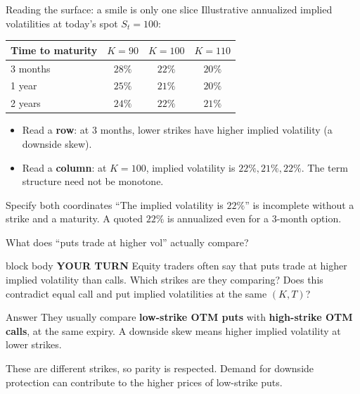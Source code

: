 \documentclass[handout,10pt,aspectratio=169]{beamer}
\newenvironment{pausebox}{\begin{beamercolorbox}[rounded=true,sep=0.8em,wd=\textwidth]{block body}
  \textbf{\color{CourseGold}YOUR TURN}\quad}{\end{beamercolorbox}}
\newcommand{\1}{\mathbf 1}
\begin{document}
\begin{frame}{Reading the surface: a smile is only one slice}
Illustrative annualized implied volatilities at today's spot \(S_t=100\):
\begin{center}
\begin{tabular}{lccc}
\toprule
Time to maturity & \(K=90\) & \(K=100\) & \(K=110\)\\
\midrule
3 months & \(28\%\) & \(22\%\) & \(20\%\)\\
1 year   & \(25\%\) & \(21\%\) & \(20\%\)\\
2 years  & \(24\%\) & \(22\%\) & \(21\%\)\\
\bottomrule
\end{tabular}
\end{center}
\begin{itemize}
\item Read a \textbf{row}: at 3 months, lower strikes have higher implied
      volatility (a downside skew).
\item Read a \textbf{column}: at \(K=100\), implied volatility is
      \(22\%,21\%,22\%\). The term structure need not be monotone.
\end{itemize}
\begin{block}{Specify both coordinates}
``The implied volatility is \(22\%\)'' is incomplete without a strike and
a maturity. A quoted \(22\%\) is annualized even for a 3-month option.
\end{block}
\end{frame}

\begin{frame}{What does ``puts trade at higher vol'' actually compare?}
\begin{pausebox}
Equity traders often say that puts trade at higher implied volatility than
calls. Which strikes are they comparing? Does this contradict equal call
and put implied volatilities at the same \((K,T)\)?
\end{pausebox}

\begin{exampleblock}{Answer}
They usually compare \textbf{low-strike OTM puts} with \textbf{high-strike
OTM calls}, at the same expiry. A downside skew means higher implied
volatility at lower strikes.
\medskip

These are different strikes, so parity is respected. Demand for downside
protection can contribute to the higher prices of low-strike puts.
\end{exampleblock}
\end{frame}
\end{document}
